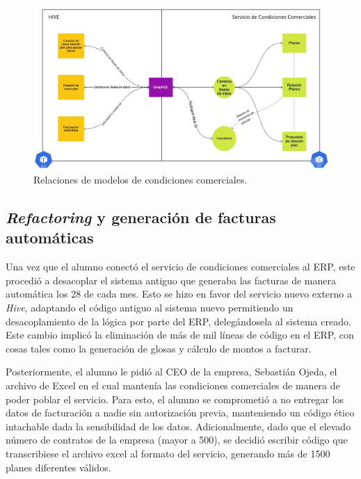     \begin{figure}
      \centering
      \includegraphics[width=\linewidth]{figures/cc/cc_arquitectura.jpg}
      \caption{Relaciones de modelos de condiciones comerciales.}
      \label{fig:cc_arquitectura}
    \end{figure}
    
  \subsection{\textit{Refactoring} y generación de facturas automáticas}

    Una vez que el alumno conectó el servicio de condiciones comerciales al ERP, este procedió a desacoplar el sistema antiguo que generaba las facturas de manera automática los 28 de cada mes. Esto se hizo en favor del servicio nuevo externo a \textit{Hive}, adaptando el código antiguo al sistema nuevo permitiendo un desacoplamiento de la lógica por parte del ERP, delegándosela al sistema creado. Este cambio implicó la eliminación de más de mil líneas de código en el ERP, con cosas tales como la generación de glosas y cálculo de montos a facturar.

    Posteriormente, el alumno le pidió al CEO de la empresa, Sebastián Ojeda, el archivo de Excel en el cual mantenía las condiciones comerciales de manera de poder poblar el servicio. Para esto, el alumno se comprometió a no entregar los datos de facturación a nadie sin autorización previa, manteniendo un código ético intachable dada la sensibilidad de los datos. Adicionalmente, dado que el elevado número de contratos de la empresa (mayor a 500), se decidió escribir código que transcribiese el archivo excel al formato del servicio, generando más de 1500 planes diferentes válidos.

